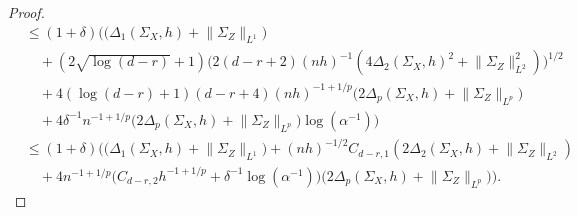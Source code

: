 \documentclass[preprint,aos]{imsart}
\numberwithin{equation}{section}
\theoremstyle{remark}
\providecommand{\norm}[1]{\lVert #1 \rVert}
\renewcommand{\le}{\leqslant}
\begin{document}
\begin{appendix}
\begin{proof}
\begin{align*}
 &\le (1+\delta) \Big(\big(\Delta_1(\Sigma_X,h)+\norm{\Sigma_Z}_{L^1}\big)\\
 &\quad +(2\sqrt{\log (d-r)} +1) \Big(2(d-r+2)(nh)^{-1}(4\Delta_2(\Sigma_X,h)^2+\norm{\Sigma_{Z}}_{L^2}^2)\Big)^{1/2}\\
 &\quad +4(\log(d-r)+1)(d-r+4)(nh)^{-1+1/p}\big(2\Delta_p(\Sigma_X,h)+\norm{\Sigma_Z}_{L^p}\big)\\
&\quad + 4\delta^{-1}n^{-1+1/p}\big(2\Delta_p(\Sigma_X,h)+\norm{\Sigma_Z}_{L^p}\big) \log(\alpha^{-1})\Big)\\
 &\le (1+\delta)\Big( \big(\Delta_1(\Sigma_X,h)+\norm{\Sigma_Z}_{L^1}\big)+(nh)^{-1/2}C_{d-r,1}(2\Delta_2(\Sigma_X,h)+\norm{\Sigma_{Z}}_{L^2})\\
 &\quad +4n^{-1+1/p}\big(C_{d-r,2}h^{-1+1/p}+\delta^{-1}\log(\alpha^{-1})\big)
 \big(2\Delta_p(\Sigma_X,h)+\norm{\Sigma_Z}_{L^p}\big)\Big).
\end{align*}


\end{proof}
\end{appendix}
\end{document}
